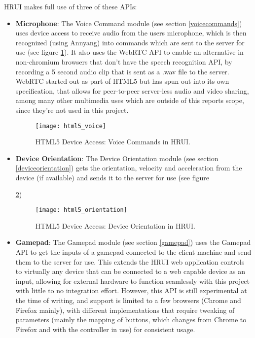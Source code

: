 HRUI makes full use of three of these APIs:\\

\begin{itemize}
  \item \textbf{Microphone}: The Voice Command module (see section \ref{voicecommands}) uses device access to receive audio
  from the users microphone, which is then recognized (using Annyang) into commands which are sent to the server for use (see
  figure \ref{html5_voice}). It also uses the WebRTC API to enable an alternative in non-chromium browsers that don't have the
  speech recognition API, by recording a 5 second audio clip that is sent as a .wav file to the server. WebRTC started out as
  part of HTML5 but has spun out into its own specification, that allows for peer-to-peer server-less audio and video sharing,
  among many other multimedia uses which are outside of this reports scope, since they're not used in this project.

  \begin{figure}[h]
    \begin{center}
      \texttt{[image: html5\_voice]}
    \end{center}
    \caption{HTML5 Device Access: Voice Commands in HRUI.\label{html5_voice}}
  \end{figure}
  \item \textbf{Device Orientation}: The Device Orientation module (see section \ref{deviceorientation}) gets the orientation,
   velocity and acceleration from the device (if available) and sends it to the server for use (see figure 

  \ref{html5_orientation})
  \begin{figure}[h]
    \begin{center}
      \texttt{[image: html5\_orientation]}
    \end{center}
    \caption{HTML5 Device Access: Device Orientation in HRUI.\label{html5_orientation}}
  \end{figure}
  \item \textbf{Gamepad}: The Gamepad module (see section \ref{gamepad}) uses the Gamepad API to get the inputs of a gamepad
  connected to the client machine and send them to the server for use. This extends the HRUI web application controls to
  virtually any device that can be connected to a web capable device as an input, allowing for external hardware to function
  seamlessly with this project with little to no integration effort. However, this API is still experimental at the time of
  writing, and support is limited to a few browsers (Chrome and Firefox mainly), with different implementations that require
  tweaking of parameters (mainly the mapping of buttons, which changes from Chrome to Firefox and with the controller in use)
  for consistent usage.
\end{itemize}
